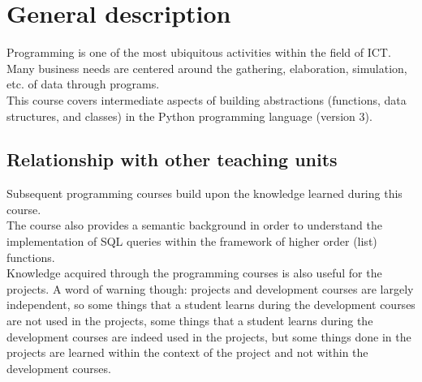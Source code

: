 \section{General description}
		Programming is one of the most ubiquitous activities within the field of ICT. Many business needs are centered around the gathering, elaboration, simulation, etc. of data through programs. \\
		
		This course covers intermediate aspects of building abstractions (functions, data structures, and classes) in the Python programming language (version 3). \\

	\subsection{Relationship with other teaching units}
		Subsequent programming courses build upon the knowledge learned during this course.	\\
		
		The course also provides a semantic background in order to understand the implementation of SQL queries within the framework of higher order (list) functions.	\\
		
		Knowledge acquired through the programming courses is also useful for the projects. A word of warning though: projects and development courses are largely independent, so some things that a student learns during the development courses are not used in the projects, some things that a student learns during the development courses are indeed used in the projects, but some things done in the projects are learned within the context of the project and not within the development courses.
